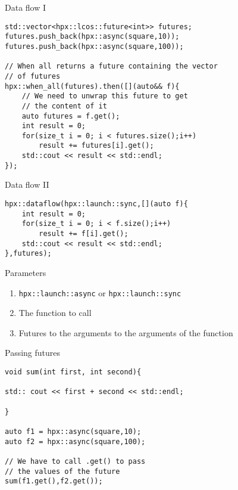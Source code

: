 \documentclass[\classoption]{beamer}
\begin{document}
\begin{frame}[fragile]{Data flow I}
\begin{lstlisting}
std::vector<hpx::lcos::future<int>> futures;
futures.push_back(hpx::async(square,10));
futures.push_back(hpx::async(square,100));

// When all returns a future containing the vector 
// of futures
hpx::when_all(futures).then([](auto&& f){
    // We need to unwrap this future to get 
    // the content of it
    auto futures = f.get();
    int result = 0;
    for(size_t i = 0; i < futures.size();i++)
        result += futures[i].get();
    std::cout << result << std::endl;
});
\end{lstlisting}
\end{frame}


\begin{frame}[fragile]{Data flow II}

\begin{lstlisting}
hpx::dataflow(hpx::launch::sync,[](auto f){
    int result = 0;
    for(size_t i = 0; i < f.size();i++)
        result += f[i].get();
    std::cout << result << std::endl;
},futures);
\end{lstlisting}

\begin{block}{Parameters}
\begin{enumerate}
\item \lstinline|hpx::launch::async| or \lstinline|hpx::launch::sync|
\item The function to call
\item Futures to the arguments to the arguments of the function
\end{enumerate}
\end{block}


\end{frame}


\begin{frame}[fragile]{Passing futures}

\begin{lstlisting}
void sum(int first, int second){

std:: cout << first + second << std::endl;

}

auto f1 = hpx::async(square,10);
auto f2 = hpx::async(square,100);

// We have to call .get() to pass 
// the values of the future
sum(f1.get(),f2.get());
\end{lstlisting}

\end{frame}
\end{document}

